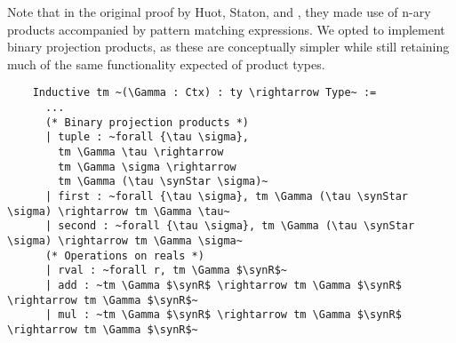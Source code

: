   Note that in the original proof by Huot, Staton, and \Vakar{} \cite{huot2020correctness}, they made use of n-ary products accompanied by pattern matching expressions.
  We opted to implement binary projection products, as these are conceptually simpler while still retaining much of the same functionality expected of product types.

  \begin{verbatim}
    Inductive tm ~(\Gamma : Ctx) : ty \rightarrow Type~ :=
      ...
      (* Binary projection products *)
      | tuple : ~forall {\tau \sigma},
        tm \Gamma \tau \rightarrow
        tm \Gamma \sigma \rightarrow
        tm \Gamma (\tau \synStar \sigma)~
      | first : ~forall {\tau \sigma}, tm \Gamma (\tau \synStar \sigma) \rightarrow tm \Gamma \tau~
      | second : ~forall {\tau \sigma}, tm \Gamma (\tau \synStar \sigma) \rightarrow tm \Gamma \sigma~
      (* Operations on reals *)
      | rval : ~forall r, tm \Gamma $\synR$~
      | add : ~tm \Gamma $\synR$ \rightarrow tm \Gamma $\synR$ \rightarrow tm \Gamma $\synR$~
      | mul : ~tm \Gamma $\synR$ \rightarrow tm \Gamma $\synR$ \rightarrow tm \Gamma $\synR$~
  \end{verbatim}





